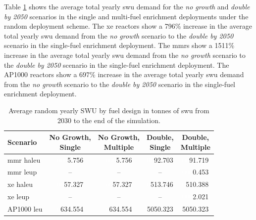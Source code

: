 Table \ref{tab:random_swu_avg} shows the average total yearly \gls{swu} demand for the \textit{no growth} and \textit{double by 2050} scenarios in the single and multi-fuel enrichment deployments under the random deployment scheme. The \gls{xe} reactors show a 796\% increase in the average total yearly \gls{swu} demand from the \textit{no growth} scenario to the \textit{double by 2050} scenario in the single-fuel enrichment deployment. The \glspl{mmr} show a 1511\% increase in the average total yearly \gls{swu} demand from the \textit{no growth} scenario to the \textit{double by 2050} scenario in the single-fuel enrichment deployment. The AP1000 reactors show a 697\% increase in the average total yearly \gls{swu} demand from the \textit{no growth} scenario to the \textit{double by 2050} scenario in the single-fuel enrichment deployment.

\begin{table}[H]
    \centering
    \caption{Average random yearly SWU by fuel design in tonnes of \gls{swu} from 2030 to the end of the simulation.}
    \label{tab:random_swu_avg}
    \begin{tabular}{l c c c c}
       \toprule
       Scenario & \shortstack{No Growth,\\ Single} & \shortstack{No Growth,\\ Multiple} & \shortstack{Double,\\ Single} & \shortstack{Double,\\ Multiple}  \\
       \midrule
       \gls{mmr} \gls{haleu}   & \textcolor{white}{000}5.756   & \textcolor{white}{000}5.756   & \textcolor{white}{00}92.703    & \textcolor{white}{00}91.719   \\
       \gls{mmr} \gls{leup}    & --      & --      & --       & \textcolor{white}{000}0.453    \\
       \gls{xe} \gls{haleu}    & \textcolor{white}{00}57.327  & \textcolor{white}{00}57.327  & \textcolor{white}{0}513.746  & \textcolor{white}{0}510.388  \\
       \gls{xe} \gls{leup}     & --      & --      & --       & \textcolor{white}{000}2.021    \\
       AP1000 \gls{leu}        & \textcolor{white}{0}634.554 & \textcolor{white}{0}634.554 & 5050.323 & 5050.323 \\
       \bottomrule
    \end{tabular}
\end{table}





